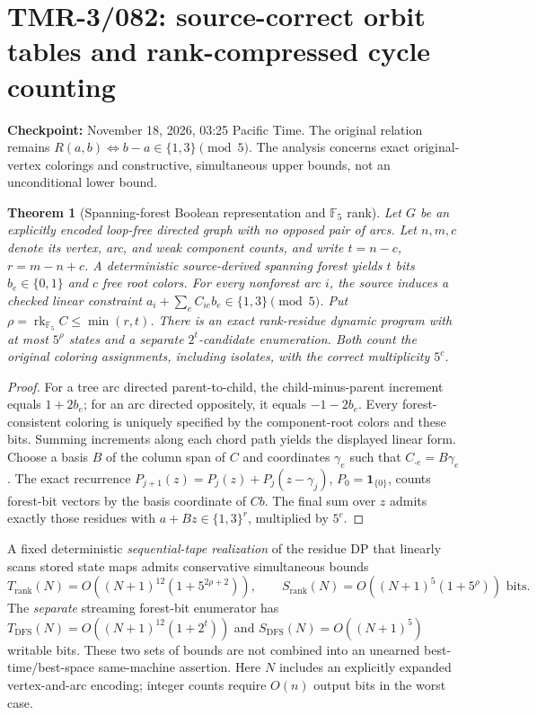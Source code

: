 \documentclass[11pt]{article}
\newtheorem{theorem}{Theorem}
\begin{document}
\section{TMR-3/082: source-correct orbit tables and rank-compressed cycle counting}
\noindent\textbf{Checkpoint:} November 18, 2026, 03:25 Pacific Time.
The original relation remains $R(a,b)\iff b-a\in\{1,3\}\pmod5$.
The analysis concerns exact original-vertex colorings and constructive,
simultaneous upper bounds, not an unconditional lower bound.

\begin{theorem}[Spanning-forest Boolean representation and $\mathbb F_5$ rank]
Let $G$ be an explicitly encoded loop-free directed graph with no
opposed pair of arcs. Let $n,m,c$ denote its vertex, arc, and weak
component counts, and write $t=n-c$, $r=m-n+c$. A deterministic
source-derived spanning forest yields $t$ bits $b_e\in\{0,1\}$ and
$c$ free root colors. For every nonforest arc $i$, the source
induces a checked linear constraint
$a_i+\sum_e C_{ie}b_e\in\{1,3\}\pmod5$.
Put $\rho=\operatorname{rk}_{\mathbb F_5}C\leq\min(r,t)$.
There is an exact rank-residue dynamic program with at most
$5^\rho$ states and a separate $2^t$-candidate enumeration.
Both count the original coloring assignments, including isolates,
with the correct multiplicity $5^c$.
\end{theorem}
\begin{proof}
For a tree arc directed parent-to-child, the child-minus-parent
increment equals $1+2b_e$; for an arc directed oppositely, it equals
$-1-2b_e$. Every forest-consistent coloring is uniquely specified
by the component-root colors and these bits. Summing increments
along each chord path yields the displayed linear form.
Choose a basis $B$ of the column span of $C$ and coordinates
$\gamma_e$ such that $C_{\cdot e}=B\gamma_e$. The exact recurrence
$P_{j+1}(z)=P_j(z)+P_j(z-\gamma_j)$, $P_0=\mathbf1_{\{0\}}$,
counts forest-bit vectors by the basis coordinate of $Cb$.
The final sum over $z$ admits exactly those residues with
$a+Bz\in\{1,3\}^r$, multiplied by $5^c$.
\end{proof}

\noindent A fixed deterministic \emph{sequential-tape realization}
of the residue DP that linearly scans stored state maps admits
conservative simultaneous bounds
\[
T_{\mathrm{rank}}(N)=
O((N+1)^{12}(1+5^{2\rho+2})),\qquad
S_{\mathrm{rank}}(N)=O((N+1)^5(1+5^\rho))\text{ bits}.
\]
The \emph{separate} streaming forest-bit enumerator has
$T_{\mathrm{DFS}}(N)=O((N+1)^{12}(1+2^t))$ and
$S_{\mathrm{DFS}}(N)=O((N+1)^5)$ writable bits.
These two sets of bounds are not combined into an unearned
best-time/best-space same-machine assertion.
Here $N$ includes an explicitly expanded vertex-and-arc encoding;
integer counts require $O(n)$ output bits in the worst case.
\end{document}
